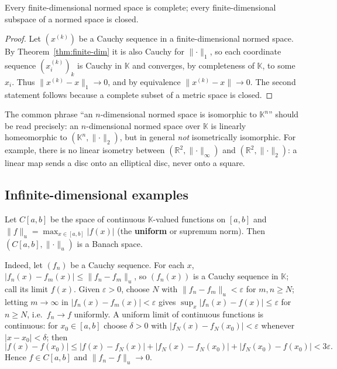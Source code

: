 \documentclass[11pt]{article}
\newcommand{\K}{\mathbb{K}}
\newcommand{\R}{\mathbb{R}}
\newcommand{\norm}[1]{\lVert #1\rVert}
\begin{document}
\begin{corollary}\label{cor:finite-complete}
Every finite-dimensional normed space is complete; every finite-dimensional subspace of a normed space is closed.
\end{corollary}

\begin{proof}
Let $(x^{(k)})$ be a Cauchy sequence in a finite-dimensional normed space. By Theorem~\ref{thm:finite-dim} it is also Cauchy for $\norm{\cdot}_{1}$, so each coordinate sequence $(x^{(k)}_{i})_{k}$ is Cauchy in $\K$ and converges, by completeness of $\K$, to some $x_{i}$. Thus $\norm{x^{(k)}-x}_{1}\to0$, and by equivalence $\norm{x^{(k)}-x}\to0$. The second statement follows because a complete subset of a metric space is closed.
\end{proof}

\begin{remark}
The common phrase ``an $n$-dimensional normed space is isomorphic to $\K^{n}$'' should be read precisely: an $n$-dimensional normed space over $\K$ is linearly homeomorphic to $(\K^{n},\norm{\cdot}_{2})$, but in general \emph{not} isometrically isomorphic. For example, there is no linear isometry between $(\R^{2},\norm{\cdot}_{\infty})$ and $(\R^{2},\norm{\cdot}_{2})$: a linear map sends a disc onto an elliptical disc, never onto a square.
\end{remark}

\subsection{Infinite-dimensional examples}

\begin{example}\label{ex:Cab}
Let $C[a,b]$ be the space of continuous $\K$-valued functions on $[a,b]$ and $\norm{f}_{u}=\max_{x\in[a,b]}|f(x)|$ (the \textbf{uniform} or supremum norm). Then $(C[a,b],\norm{\cdot}_{u})$ is a Banach space.

Indeed, let $(f_{n})$ be a Cauchy sequence. For each $x$, $|f_{n}(x)-f_{m}(x)|\le\norm{f_{n}-f_{m}}_{u}$, so $(f_{n}(x))$ is a Cauchy sequence in $\K$; call its limit $f(x)$. Given $\varepsilon>0$, choose $N$ with $\norm{f_{n}-f_{m}}_{u}<\varepsilon$ for $m,n\ge N$; letting $m\to\infty$ in $|f_{n}(x)-f_{m}(x)|<\varepsilon$ gives $\sup_{x}|f_{n}(x)-f(x)|\le\varepsilon$ for $n\ge N$, i.e.\ $f_{n}\to f$ uniformly. A uniform limit of continuous functions is continuous: for $x_{0}\in[a,b]$ choose $\delta>0$ with $|f_{N}(x)-f_{N}(x_{0})|<\varepsilon$ whenever $|x-x_{0}|<\delta$; then
\[
|f(x)-f(x_{0})|\le|f(x)-f_{N}(x)|+|f_{N}(x)-f_{N}(x_{0})|+|f_{N}(x_{0})-f(x_{0})|<3\varepsilon .
\]
Hence $f\in C[a,b]$ and $\norm{f_{n}-f}_{u}\to0$.
\end{example}
\end{document}
